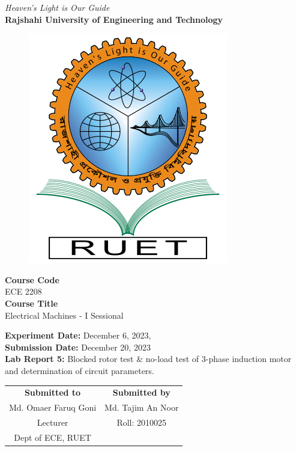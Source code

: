 \vspace*{\fill}
\begin{center}

    \emph{Heaven's Light is Our Guide} \\
    \textbf{Rajshahi University of Engineering and Technology} \\

    \begin{figure}[h]
        \centering
        \includegraphics[scale=.34]{images/RUET_logo.png}
        \label{fig:ruet_logo}
    \end{figure}
    \vspace{5mm}

    \textbf{Course Code}\\
    ECE 2208\\
    \vspace{3mm}
    \textbf{Course Title}\\
    Electrical Machines - I Sessional

    \vspace{5mm}
    \textbf{Experiment Date:} {December 6, 2023,}\\
    \textbf{Submission Date:} {December 20, 2023}\\

    \vspace{5mm}
    \textbf{Lab Report 5:} Blocked rotor test \& no-load test of 3-phase induction motor and determination of circuit parameters.\\

    \vspace{15mm}

    \begin{tabular}{c|c}
        \textbf{Submitted to} & \textbf{Submitted by} \\
        Md. Omaer Faruq Goni  & Md. Tajim An Noor     \\
        Lecturer              & Roll: 2010025         \\
        Dept of ECE, RUET     &                       \\
    \end{tabular}

\end{center}
\vspace*{\fill}
